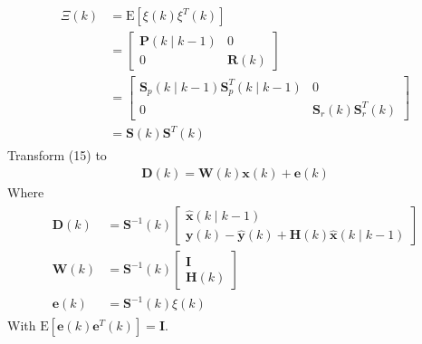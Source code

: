 \documentclass[dvipdfmx]{jsarticle}
\begin{document}
\begin{equation}\label{Func.}\begin{aligned}
    \begin{aligned}
        \Xi(k) &=\mathrm{E}\left[\xi(k) \xi^{T}(k)\right] \\
        &=\left[\begin{array}{cc}
        \mathbf{P}(k \mid k-1) & 0 \\
        0 & \mathbf{R}(k)
        \end{array}\right] \\
        &=\left[\begin{array}{cc}
        \mathbf{S}_{p}(k \mid k-1) \mathbf{S}_{p}^{T}(k \mid k-1) & 0 \\
        0 & \mathbf{S}_{r}(k) \mathbf{S}_{r}^{T}(k)
        \end{array}\right] \\
        &=\mathbf{S}(k) \mathbf{S}^{T}(k)
        \end{aligned}
\end{aligned}\end{equation}
Transform (15) to
\begin{equation}\label{Func.}\begin{aligned}
    \mathbf{D}(k)=\mathbf{W}(k) \mathbf{x}(k)+\mathbf{e}(k)
\end{aligned}\end{equation}
Where
\begin{equation}\nonumber\label{Func.}\begin{aligned}
    \begin{aligned}
        \mathbf{D}(k) &=\mathbf{S}^{-1}(k)\left[\begin{array}{c}
        \widehat{\mathbf{x}}(k \mid k-1) \\
        \mathbf{y}(k)-\widehat{\mathbf{y}}(k)+\mathbf{H}(k) \widehat{\mathbf{x}}(k \mid k-1)
        \end{array}\right] \\
        \mathbf{W}(k) &=\mathbf{S}^{-1}(k)\left[\begin{array}{c}
        \mathbf{I} \\
        \mathbf{H}(k)
        \end{array}\right] \\
        \mathbf{e}(k) &=\mathbf{S}^{-1}(k) \xi(k)
        \end{aligned}
\end{aligned}\end{equation}
With $\mathrm{E}\left[\mathbf{e}(k) \mathbf{e}^{T}(k)\right]=\mathbf{I}$.
\end{document}
